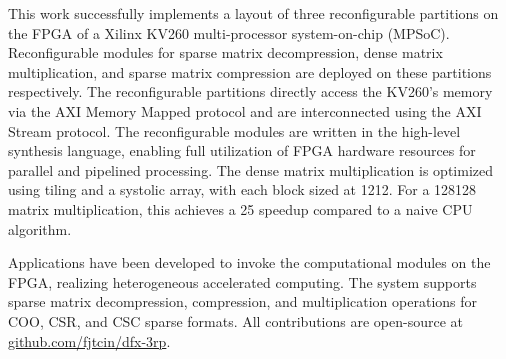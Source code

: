 

\begin{abstract}
本工作在Xilinx KV260多处理器系统芯片的FPGA上，成功实现了3个可重构分区的布局，并在上面分别部署了稀疏矩阵解压、稠密矩阵乘法、稀疏矩阵压缩的可重构模块。
可重构分区通过AXIMM协议对KV260的内存直接访问，同时通过AXIS协议进行互联。
可重构模块使用高层次综合语言编写，能充分利用FPGA的硬件资源，实现并行、流水线地处理。
稠密矩阵乘法使用分块与脉动阵列优化，每个块大小12\texttimes{}12，对于128\texttimes{}128矩阵乘法相较CPU朴素算法实现了25\texttimes{}的加速比。

在KV260的CPU上，编写程序调用FPGA上的计算模块，实现了异构加速计算。
支持COO, CSR和CSC三种稀疏格式的稀疏矩阵解压/压缩/乘法操作。所有贡献开源于 \url{github.com/fjtcin/dfx-3rp}。
\end{abstract}

\begin{abstract*}
This work successfully implements a layout of three reconfigurable partitions on the FPGA of a Xilinx KV260 multi-processor system-on-chip (MPSoC).
Reconfigurable modules for sparse matrix decompression, dense matrix multiplication, and sparse matrix compression are deployed on these partitions respectively.
The reconfigurable partitions directly access the KV260's memory via the AXI Memory Mapped protocol and are interconnected using the AXI Stream protocol.
The reconfigurable modules are written in the high-level synthesis language,
enabling full utilization of FPGA hardware resources for parallel and pipelined processing.
The dense matrix multiplication is optimized using tiling and a systolic array, with each block sized at 12\texttimes{}12.
For a 128\texttimes{}128 matrix multiplication, this achieves a 25\texttimes{} speedup compared to a naive CPU algorithm.

Applications have been developed to invoke the computational modules on the FPGA,
realizing heterogeneous accelerated computing. The system supports sparse matrix decompression,
compression, and multiplication operations for COO, CSR, and CSC sparse formats. All contributions are open-source at \url{github.com/fjtcin/dfx-3rp}.
\end{abstract*}
